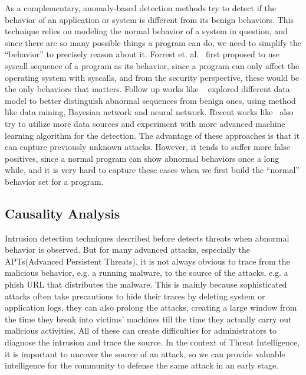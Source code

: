 As a complementary, anomaly-based detection methods try to detect if
the behavior of an application or system is different from its benign
behaviors. This technique relies on modeling the normal behavior of a 
system in question, and since there are so many possible things a program 
can do, we need to simplify the ``behavior'' to precisely reason about 
it. Forrest et. al.~\cite{forrest1996sense} first proposed to use
syscall sequence of a program as its behavior, since a program can only
affect the operating system with syscalls, and from the security 
perspective, these would be the only behaviors that matters. Follow up
works like ~\cite{lee1998data, warrender1999detecting, mutz2006anomalous}
explored different data model to better distinguish abnormal sequences
from benign ones, using method like data mining, Bayesian network and 
neural network. Recent works like~\cite{du2017deeplog} also try to 
utilize more data sources and experiment with more advanced machine
learning algorithm for the detection. The advantage of these approaches 
is that it can capture previously unknown attacks. However, it tends
to suffer more false positives, since a normal program can show abnormal
behaviors once a long while, and it is very hard to capture these
cases when we first build the ``normal'' behavior set for a program.

\subsection{Causality Analysis}
Intrusion detection techniques described before detects threats 
when abnormal behavior is observed. But for many advanced 
attacks, especially the APTs(Advanced Persistent Threats), it 
is not always obvious to trace from the malicious behavior, e.g.
a running malware, to the source of the attacks, e.g. a phish 
URL that distributes the malware. This is mainly because sophisticated
attacks often take precautions to hide their traces by deleting
system or application logs, they can also prolong the attacks, 
creating a large window from the time they break into victims' 
machines till the time they actually carry out malicious activities. 
All of these can create difficulties for administrators to diagnose
the intrusion and trace the source. In the context of Threat 
Intelligence, it is important to uncover the source of 
an attack, so we can provide valuable intelligence for the community 
to defense the same attack in an early stage.

